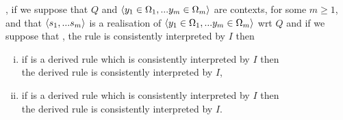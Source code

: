 \begin{lemma}
\IfIpartialmappingUtoC,
if we suppose that $Q$ and $\langle y_1 \in \Omega_1,... y_{m} \in \Omega_{m}\rangle$ are contexts, for some $m \geq 1$, 
and that $\langle s_1,...s_{m}\rangle$ is a realisation of $\langle y_1 \in \Omega_1,... y_{m} \in \Omega_{m}\rangle$ wrt $Q$ and
if we suppose that \foreachj, the rule  is consistently interpreted by $I$ then
\begin{enumerate}[(i)]
\item if \ZOmega is a derived rule which is consistently interpreted by $I$ then \\
the derived rule \ZOmegaSUBsmFORym is consistently interpreted by $I$,
\item if \ZsOmega is a derived rule which is consistently interpreted by $I$ then \\
the derived rule \ZsOmegaSUBsmFORym is consistently interpreted by $I$.
\end{enumerate}
\end{lemma}
